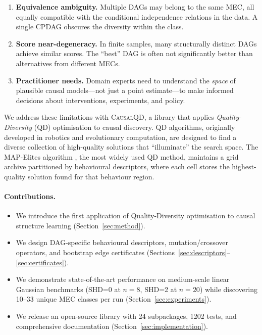 \documentclass[11pt,a4paper]{article}
\begin{document}
\begin{enumerate}[leftmargin=*]
    \item \textbf{Equivalence ambiguity.} Multiple DAGs may belong to the same MEC, all equally compatible with the conditional independence relations in the data. A single CPDAG obscures the diversity within the class.
    
    \item \textbf{Score near-degeneracy.} In finite samples, many structurally distinct DAGs achieve similar scores. The ``best'' DAG is often not significantly better than alternatives from different MECs.
    
    \item \textbf{Practitioner needs.} Domain experts need to understand the \emph{space} of plausible causal models---not just a point estimate---to make informed decisions about interventions, experiments, and policy.
\end{enumerate}

We address these limitations with \textsc{CausalQD}, a library that applies \emph{Quality-Diversity} (QD) optimisation \citep{pugh2016quality,mouret2015illuminating} to causal discovery. QD algorithms, originally developed in robotics and evolutionary computation, are designed to find a diverse collection of high-quality solutions that ``illuminate'' the search space. The MAP-Elites algorithm \citep{mouret2015illuminating}, the most widely used QD method, maintains a grid archive partitioned by behavioural descriptors, where each cell stores the highest-quality solution found for that behaviour region.

\paragraph{Contributions.}
\begin{itemize}[leftmargin=*]
    \item We introduce the first application of Quality-Diversity optimisation to causal structure learning (Section~\ref{sec:method}).
    \item We design DAG-specific behavioural descriptors, mutation/crossover operators, and bootstrap edge certificates (Sections~\ref{sec:descriptors}--\ref{sec:certificates}).
    \item We demonstrate state-of-the-art performance on medium-scale linear Gaussian benchmarks (SHD=0 at $n=8$, SHD=2 at $n=20$) while discovering 10--33 unique MEC classes per run (Section~\ref{sec:experiments}).
    \item We release an open-source library with 24 subpackages, 1202 tests, and comprehensive documentation (Section~\ref{sec:implementation}).
\end{itemize}
\end{document}
